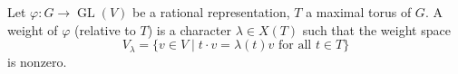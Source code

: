 Let $\varphi: G \rightarrow \operatorname{GL}(V)$ be a rational representation, $T$ a maximal torus of $G$. A weight of $\varphi$ (relative to $T$) is a character $\lambda \in X(T)$ such that the weight space
$$V_\lambda = \{v \in V \mid t \cdot v = \lambda(t)v \text{ for all } t \in T\}$$
is nonzero.
